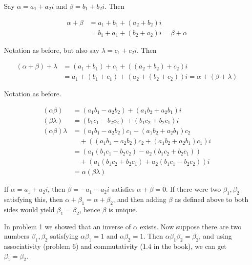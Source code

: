 \documentclass{article}
\begin{document}

Say $\alpha = a_1 + a_2i$ and $\beta = b_1 + b_2i$. Then

\begin{align*}
  \alpha + \beta & = a_1 + b_1 + (a_2 + b_2)i \\
                 & = b_1 + a_1 + (b_2 + a_2)i = \beta + \alpha
\end{align*}


Notation as before, but also say $\lambda = c_1 + c_2i$. Then

\begin{align*}
  (\alpha + \beta) + \lambda & = (a_1 + b_1) + c_1 + ((a_2 + b_2) + c_2)i \\
                             & = a_1 + (b_1 + c_1) + (a_2 + (b_2 + c_2))i = \alpha + (\beta + \lambda)
\end{align*}


Notation as before.

\begin{align*}
  (\alpha\beta) & = (a_1b_1 - a_2b_2) + (a_1b_2 + a_2b_1)i \\
  (\beta\lambda) & = (b_1c_1 - b_2c_2) + (b_1c_2 + b_2c_1)i \\
  (\alpha\beta)\lambda & = (a_1b_1 - a_2b_2)c_1 - (a_1b_2 + a_2b_1)c_2 \\
                & \quad + ((a_1b_1 - a_2b_2)c_2 + (a_1b_2 + a_2b_1)c_1)i \\
                & = (a_1(b_1c_1 - b_2c_2) - a_2(b_1c_2 + b_2c_1)) \\
                & \quad + (a_1(b_1c_2 + b_2c_1) + a_2(b_1c_1 - b_2c_2))i \\
                & = \alpha(\beta\lambda)
\end{align*}


If $\alpha = a_1 + a_2i$, then $\beta = -a_1 - a_2i$ satisfies $\alpha + \beta =
0$. If there were two $\beta_1, \beta_2$ satisfying this, then $\alpha + \beta_1
= \alpha + \beta_2$, and then adding $\beta$ as defined above to both sides
would yield $\beta_1 = \beta_2$, hence $\beta$ is unique.


In problem 1 we showed that an inverse of $\alpha$ exists. Now suppose there are
two numbers $\beta_1, \beta_2$ satisfying $\alpha\beta_1 = 1$ and $\alpha\beta_2
= 1$. Then $\alpha\beta_1\beta_2 = \beta_2$, and using associativity (problem 6)
and commutativity (1.4 in the book), we can get $\beta_1 = \beta_2$.
\end{document}
